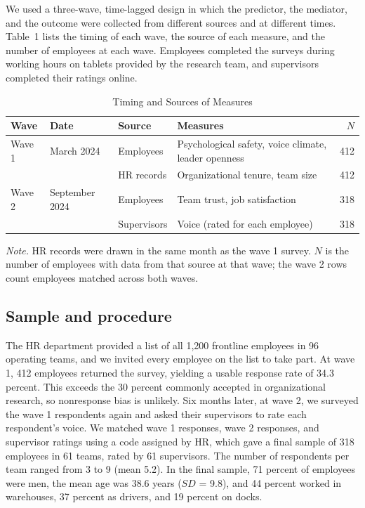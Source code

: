 \documentclass[11pt]{article}
\begin{document}
We used a three-wave, time-lagged design in which the predictor, the mediator, and the outcome were collected from different sources and at different times. Table~1 lists the timing of each wave, the source of each measure, and the number of employees at each wave. Employees completed the surveys during working hours on tablets provided by the research team, and supervisors completed their ratings online.

\begin{table}[ht]
\centering
\begin{threeparttable}
\caption{Timing and Sources of Measures}
\small
\begin{tabular}{lllp{6.4cm}r}
\toprule
Wave & Date & Source & Measures & $N$ \\
\midrule
Wave 1 & March 2024 & Employees & Psychological safety, voice climate, leader openness & 412 \\
       &            & HR records & Organizational tenure, team size & 412 \\
Wave 2 & September 2024 & Employees & Team trust, job satisfaction & 318 \\
       &                & Supervisors & Voice (rated for each employee) & 318 \\
\bottomrule
\end{tabular}
\begin{tablenotes}\footnotesize
\item \textit{Note.} HR records were drawn in the same month as the wave 1 survey. $N$ is the number of employees with data from that source at that wave; the wave 2 rows count employees matched across both waves.
\end{tablenotes}
\end{threeparttable}
\end{table}

\subsection{Sample and procedure}

The HR department provided a list of all 1,200 frontline employees in 96 operating teams, and we invited every employee on the list to take part. At wave 1, 412 employees returned the survey, yielding a usable response rate of 34.3 percent. This exceeds the 30 percent commonly accepted in organizational research, so nonresponse bias is unlikely. Six months later, at wave 2, we surveyed the wave 1 respondents again and asked their supervisors to rate each respondent's voice. We matched wave 1 responses, wave 2 responses, and supervisor ratings using a code assigned by HR, which gave a final sample of 318 employees in 61 teams, rated by 61 supervisors. The number of respondents per team ranged from 3 to 9 (mean 5.2). In the final sample, 71 percent of employees were men, the mean age was 38.6 years ($SD$ = 9.8), and 44 percent worked in warehouses, 37 percent as drivers, and 19 percent on docks.
\end{document}
